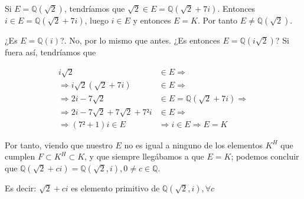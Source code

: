 \documentclass{apuntes}
\begin{document}
\begin{example}
Si $E = ℚ(\sqrt{2})$, tendríamos que $\sqrt{2} ∈ E = ℚ(\sqrt{2} + 7i)$. Entonces $i ∈ E = ℚ(\sqrt{2} + 7i)$, luego $i ∈ E$ y entonces $E = K$. Por tanto $E ≠ ℚ(\sqrt{2})$.

¿Es $E = ℚ(i)$?. No, por lo mismo que antes. ¿Es entonces $E = ℚ(i\sqrt{2})$? Si fuera así, tendríamos que

\begin{align*}
i\sqrt{2} &∈ E \Rightarrow \\
\Rightarrow i\sqrt{2} (\sqrt{2} + 7i) &∈ E \Rightarrow \\
\Rightarrow 2i - 7\sqrt{2} &∈ E = ℚ(\sqrt{2} + 7i) \Rightarrow \\
\Rightarrow 2i - 7\sqrt{2} + 7\sqrt{2} + 7²i &∈ E \Rightarrow \\
\Rightarrow (7²+1)i ∈ E &\Rightarrow i ∈ E \Rightarrow E = K
\end{align*}

Por tanto, viendo que nuestro $E$ no es igual a ninguno de los elementos $K^H$ que cumplen $F \subset K^H \subset K$, y que siempre llegábamos a que $E=K$; podemos concluir que $ℚ(\sqrt{2} + ci) = ℚ(\sqrt{2}, i), 0 ≠ c ∈ ℚ$.

Es decir: $\sqrt{2} + ci$ es elemento primitivo de $ℚ(\sqrt{2}, i), ∀c$
\end{example}
\end{document}
